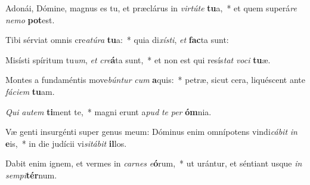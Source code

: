 \item Adonái, Dómine, magnus es tu, et præclárus in \textit{vir}\textit{tú}\textit{te} \textbf{tu}a,~* et quem superá\textit{re} \textit{ne}\textit{mo} \textbf{pot}est.
\item Tibi sérviat omnis cre\textit{a}\textit{tú}\textit{ra} \textbf{tu}a:~* quia di\textit{xís}\textit{ti}, \textit{et} \textbf{fac}ta sunt:
\item Misísti spíritum tu\textit{um}, \textit{et} \textit{cre}\textbf{á}ta sunt,~* et non est qui resís\textit{tat} \textit{vo}\textit{ci} \textbf{tu}æ.
\item Montes a fundaméntis move\textit{bún}\textit{tur} \textit{cum} \textbf{a}quis:~* petræ, sicut cera, liquéscent ante \textit{fá}\textit{ci}\textit{em} \textbf{tu}am.
\item \textit{Qui} \textit{au}\textit{tem} \textbf{ti}ment te,~* magni erunt a\textit{pud} \textit{te} \textit{per} \textbf{óm}nia.
\item Væ genti insurgénti super genus meum: Dóminus enim omnípotens vindi\textit{cá}\textit{bit} \textit{in} \textbf{e}is,~* in die judícii vi\textit{si}\textit{tá}\textit{bit} \textbf{il}los.
\item Dabit enim ignem, et vermes in \textit{car}\textit{nes} \textit{e}\textbf{ó}rum,~* ut urántur, et séntiant usque \textit{in} \textit{sem}\textit{pi}\textbf{tér}num.

